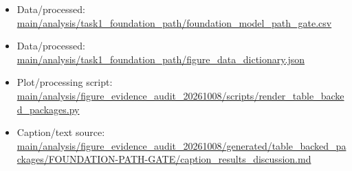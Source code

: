 \begin{itemize}[leftmargin=1.4em,noitemsep]
\item Data/processed: \begingroup\scriptsize\url{main/analysis/task1_foundation_path/foundation_model_path_gate.csv}\endgroup
\item Data/processed: \begingroup\scriptsize\url{main/analysis/task1_foundation_path/figure_data_dictionary.json}\endgroup
\item Plot/processing script: \begingroup\scriptsize\url{main/analysis/figure_evidence_audit_20261008/scripts/render_table_backed_packages.py}\endgroup
\item Caption/text source: \begingroup\scriptsize\url{main/analysis/figure_evidence_audit_20261008/generated/table_backed_packages/FOUNDATION-PATH-GATE/caption_results_discussion.md}\endgroup
\end{itemize}
